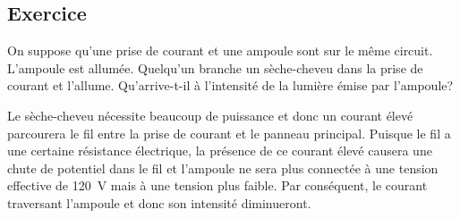 \subsection*{Exercice}
On suppose qu'une prise de courant et une ampoule sont sur le même circuit.
L'ampoule est allumée. Quelqu'un branche un sèche-cheveu dans la prise de
courant et l'allume. Qu'arrive-t-il à l'intensité de la lumière émise par
l'ampoule?

Le sèche-cheveu nécessite beaucoup de puissance et donc un courant élevé
parcourera le fil entre la prise de courant et le panneau principal. Puisque le
fil a une certaine résistance électrique, la présence de ce courant élevé
causera une chute de potentiel dans le fil et l'ampoule ne sera plus connectée
à une tension effective de \SI{120}{V} mais à une tension plus faible. Par
conséquent, le courant traversant l'ampoule et donc son intensité diminueront.



